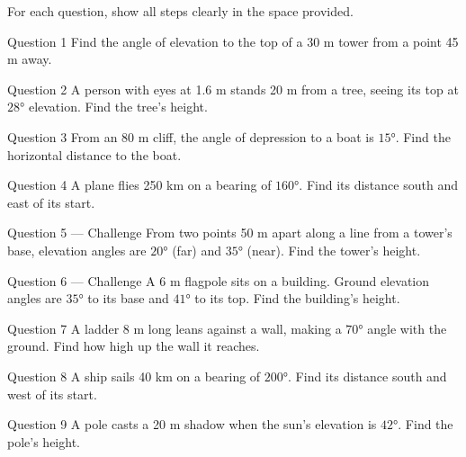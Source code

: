 \documentclass[11pt]{article}
\begin{document}
\clearpage
{}
For each question, show all steps clearly in the space provided.

\begin{qbox}{Question 1}
Find the angle of elevation to the top of a 30 m tower from a point 45 m away.\workspace{2.4cm}
\end{qbox}

\begin{qbox}{Question 2}
A person with eyes at 1.6 m stands 20 m from a tree, seeing its top at $28°$ elevation. Find the tree's height.\workspace{2.4cm}
\end{qbox}

\begin{qbox}{Question 3}
From an 80 m cliff, the angle of depression to a boat is $15°$. Find the horizontal distance to the boat.\workspace{2.4cm}
\end{qbox}

\begin{qbox}{Question 4}
A plane flies 250 km on a bearing of $160°$. Find its distance south and east of its start.\workspace{2.4cm}
\end{qbox}

\begin{qbox}{Question 5 --- Challenge}
From two points 50 m apart along a line from a tower's base, elevation angles are $20°$ (far) and $35°$ (near). Find the tower's height.\workspace{3.4cm}
\end{qbox}

\begin{qbox}{Question 6 --- Challenge}
A 6 m flagpole sits on a building. Ground elevation angles are $35°$ to its base and $41°$ to its top. Find the building's height.\workspace{3.4cm}
\end{qbox}

\begin{qbox}{Question 7}
A ladder 8 m long leans against a wall, making a $70°$ angle with the ground. Find how high up the wall it reaches.\workspace{2.4cm}
\end{qbox}

\begin{qbox}{Question 8}
A ship sails 40 km on a bearing of $200°$. Find its distance south and west of its start.\workspace{2.4cm}
\end{qbox}

\begin{qbox}{Question 9}
A pole casts a 20 m shadow when the sun's elevation is $42°$. Find the pole's height.\workspace{2.4cm}
\end{qbox}
\end{document}
